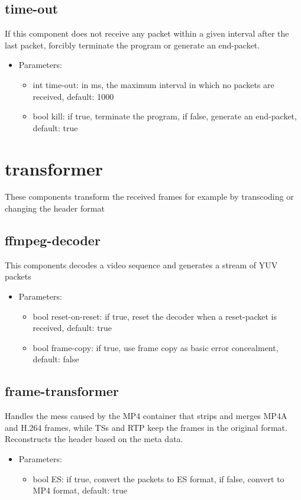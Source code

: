 \subsection{time-out}
If this component does not receive any packet within a given interval after the last packet, forcibly terminate the program or generate an end-packet.
\begin{itemize}
\item Parameters:
\begin{itemize}
\item int time-out: in ms, the maximum interval in which no packets are received, default: 1000
\item bool kill: if true, terminate the program, if false, generate an end-packet, default: true
\end{itemize}
\end{itemize}
\newpage
\section{transformer}
These components transform the received frames for example by transcoding or changing the header format
\subsection{ffmpeg-decoder}
This components decodes a video sequence and generates a stream of YUV packets
\begin{itemize}
\item Parameters:
\begin{itemize}
\item bool reset-on-reset: if true, reset the decoder when a reset-packet is received, default: true
\item bool frame-copy: if true, use frame copy as basic error concealment, default: false
\end{itemize}
\end{itemize}
\subsection{frame-transformer}
Handles the mess caused by the MP4 container that strips and merges MP4A and H.264 frames, while TSs and RTP keep the frames in the original format. Reconstructs the header based on the meta data.
\begin{itemize}
\item Parameters:
\begin{itemize}
\item bool ES: if true, convert the packets to ES format, if false, convert to MP4 format, default: true
\end{itemize}
\end{itemize}
